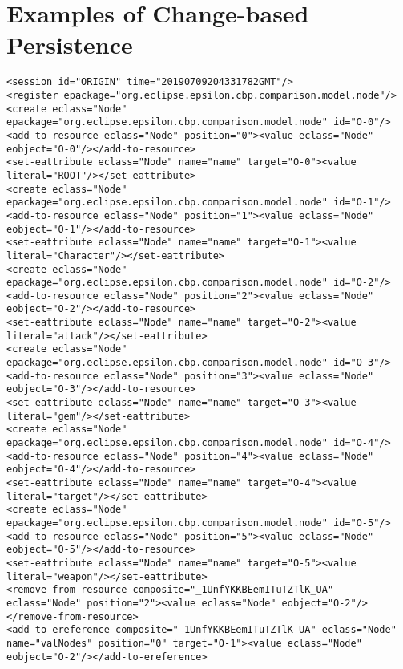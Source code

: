 \chapter{Examples of Change-based Persistence}
\label{sec:examples_of_cbp}

\begin{lstlisting}[style=cbpfile,caption={Change-based representation of the model in Figure \ref{fig:class_diagram_left}.},label=lst:class_diagram_left_cbpfile]
<session id="ORIGIN" time="20190709204331782GMT"/>
<register epackage="org.eclipse.epsilon.cbp.comparison.model.node"/>
<create eclass="Node" epackage="org.eclipse.epsilon.cbp.comparison.model.node" id="O-0"/>
<add-to-resource eclass="Node" position="0"><value eclass="Node" eobject="O-0"/></add-to-resource>
<set-eattribute eclass="Node" name="name" target="O-0"><value literal="ROOT"/></set-eattribute>
<create eclass="Node" epackage="org.eclipse.epsilon.cbp.comparison.model.node" id="O-1"/>
<add-to-resource eclass="Node" position="1"><value eclass="Node" eobject="O-1"/></add-to-resource>
<set-eattribute eclass="Node" name="name" target="O-1"><value literal="Character"/></set-eattribute>
<create eclass="Node" epackage="org.eclipse.epsilon.cbp.comparison.model.node" id="O-2"/>
<add-to-resource eclass="Node" position="2"><value eclass="Node" eobject="O-2"/></add-to-resource>
<set-eattribute eclass="Node" name="name" target="O-2"><value literal="attack"/></set-eattribute>
<create eclass="Node" epackage="org.eclipse.epsilon.cbp.comparison.model.node" id="O-3"/>
<add-to-resource eclass="Node" position="3"><value eclass="Node" eobject="O-3"/></add-to-resource>
<set-eattribute eclass="Node" name="name" target="O-3"><value literal="gem"/></set-eattribute>
<create eclass="Node" epackage="org.eclipse.epsilon.cbp.comparison.model.node" id="O-4"/>
<add-to-resource eclass="Node" position="4"><value eclass="Node" eobject="O-4"/></add-to-resource>
<set-eattribute eclass="Node" name="name" target="O-4"><value literal="target"/></set-eattribute>
<create eclass="Node" epackage="org.eclipse.epsilon.cbp.comparison.model.node" id="O-5"/>
<add-to-resource eclass="Node" position="5"><value eclass="Node" eobject="O-5"/></add-to-resource>
<set-eattribute eclass="Node" name="name" target="O-5"><value literal="weapon"/></set-eattribute>
<remove-from-resource composite="_1UnfYKKBEemITuTZTlK_UA" eclass="Node" position="2"><value eclass="Node" eobject="O-2"/></remove-from-resource>
<add-to-ereference composite="_1UnfYKKBEemITuTZTlK_UA" eclass="Node" name="valNodes" position="0" target="O-1"><value eclass="Node" eobject="O-2"/></add-to-ereference>

\end{lstlisting}
